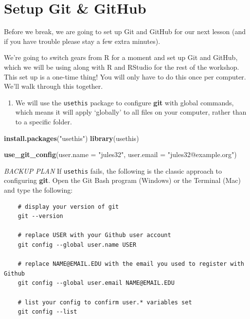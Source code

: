 \documentclass[]{book}
\newenvironment{Shaded}{\begin{snugshade}}{\end{snugshade}}
\newcommand{\DataTypeTok}[1]{\textcolor[rgb]{0.13,0.29,0.53}{#1}}
\newcommand{\KeywordTok}[1]{\textcolor[rgb]{0.13,0.29,0.53}{\textbf{#1}}}
\newcommand{\NormalTok}[1]{#1}
\newcommand{\StringTok}[1]{\textcolor[rgb]{0.31,0.60,0.02}{#1}}
\providecommand{\tightlist}{%
  \setlength{\itemsep}{0pt}\setlength{\parskip}{0pt}}
\begin{document}
\hypertarget{setup-git-github}{%
\section{Setup Git \& GitHub}\label{setup-git-github}}

Before we break, we are going to set up Git and GitHub for our next lesson (and if you have trouble please stay a few extra minutes).

We're going to switch gears from R for a moment and set up Git and GitHub, which we will be using along with R and RStudio for the rest of the workshop. This set up is a one-time thing! You will only have to do this once per computer. We'll walk through this together.

\begin{enumerate}
\def\labelenumi{\arabic{enumi}.}
\tightlist
\item
  We will use the \texttt{usethis} package to configure \textbf{git} with global commands, which means it will apply `globally' to all files on your computer, rather than to a specific folder.
\end{enumerate}

\begin{Shaded}
\begin{Highlighting}[]
\KeywordTok{install.packages}\NormalTok{(}\StringTok{"usethis"}\NormalTok{)}
\KeywordTok{library}\NormalTok{(usethis)}

\KeywordTok{use_git_config}\NormalTok{(}\DataTypeTok{user.name =} \StringTok{"jules32"}\NormalTok{, }\DataTypeTok{user.email =} \StringTok{"jules32@example.org"}\NormalTok{)}
\end{Highlighting}
\end{Shaded}

\emph{BACKUP PLAN} If \texttt{usethis} fails, the following is the classic approach to configuring \textbf{git}. Open the Git Bash program (Windows) or the Terminal (Mac) and type the following:

\begin{verbatim}
    # display your version of git
    git --version
    
    # replace USER with your Github user account
    git config --global user.name USER
    
    # replace NAME@EMAIL.EDU with the email you used to register with Github
    git config --global user.email NAME@EMAIL.EDU
    
    # list your config to confirm user.* variables set
    git config --list
\end{verbatim}
\end{document}
